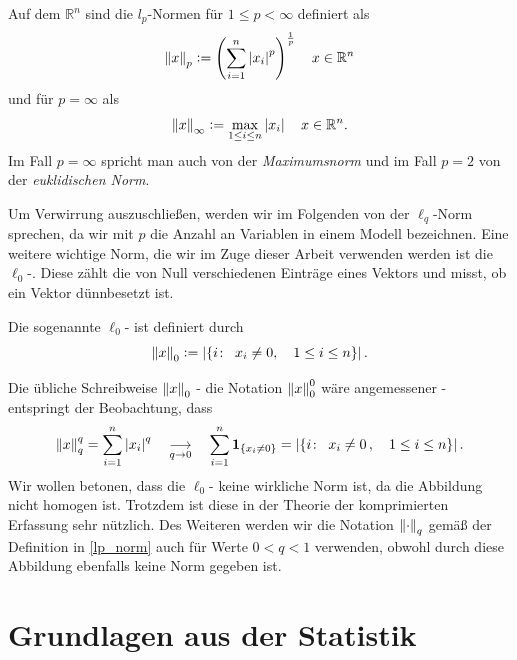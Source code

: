\begin{defn} 
\label{lp_norm}
Auf dem $\mathbb{R}^n$ sind die $l_p$-Normen für $1 \leq p < \infty$ definiert als
$$\left\lVert x \right\rVert_p \vcentcolon= \left( \sum_{i=1}^{n} \left\lvert x_i \right\rvert^{p} \right) ^{\frac{1}{p}} \quad x \in \mathbb{R}^{n}$$
und für $p = \infty$ als
$$\left\lVert x \right\rVert_{\infty} \vcentcolon= \max_{1 \leq i \leq n} \left\lvert x_i \right\rvert \quad x \in \mathbb{R}^{n}.$$
Im Fall $p = \infty$ spricht man auch von der \textit{Maximumsnorm} und im Fall $p = 2$ von der \textit{euklidischen Norm}.
\end{defn}

Um Verwirrung auszuschließen, werden wir im Folgenden von der $\ell_q$-Norm sprechen, da wir mit $p$ die Anzahl an Variablen in einem Modell bezeichnen. Eine weitere wichtige Norm, die wir im Zuge dieser Arbeit verwenden werden ist die $\ell_0$-. Diese zählt die von Null verschiedenen Einträge eines Vektors und misst, ob ein Vektor dünnbesetzt ist.

\begin{defn}
Die sogenannte $\ell_0$- ist definiert durch
$$\left\lVert x \right\rVert_{0} \vcentcolon= \left|\{i \colon \enspace x_i \neq 0 , \quad 1 \leq i \leq n\}\right|.$$
\end{defn}

Die übliche Schreibweise $\left\lVert x \right\rVert_0$ - die Notation $\left\lVert x \right\rVert_{0}^{0}$ wäre angemessener - entspringt der Beobachtung, dass 
$$\left\lVert x \right\rVert_{q}^{q} = \sum_{i=1}^{n} \left\lvert x_i \right\rvert^q \quad \underset{q \rightarrow 0}{\longrightarrow} \quad \sum_{i=1}^{n} \mathbf{1}_{\{x_i \neq 0\}} = \left|\{i \colon \enspace x_i \neq 0\, , \quad 1 \leq i \leq n\}\right|.$$
Wir wollen betonen, dass die $\ell_0$- keine wirkliche Norm ist, da die Abbildung nicht homogen ist. Trotzdem ist diese  in der Theorie der komprimierten Erfassung sehr nützlich. Des Weiteren werden wir die Notation $\left\lVert \cdot \right\rVert_q$ gemäß der Definition in \ref{lp_norm} auch für Werte $0 < q < 1$ verwenden, obwohl durch diese Abbildung ebenfalls keine Norm gegeben ist.




\section{Grundlagen aus der Statistik}

